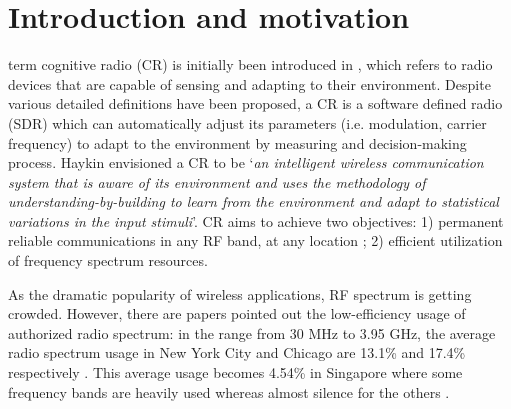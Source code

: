 \documentclass[journal]{IEEEtran}
\begin{document}
\section{Introduction and motivation}
%
%
%
%
 term cognitive radio (CR) is initially been introduced in \cite{mitola1999cognitive}, which refers to radio devices that are capable of sensing and adapting to their environment.  Despite various detailed definitions have been proposed, a CR is a software defined radio (SDR) which can automatically adjust its parameters (i.e. modulation, carrier frequency) to adapt to the environment by measuring and decision-making process. Haykin \cite{haykin2005cognitive} envisioned a CR to be `\textsl{an intelligent wireless communication system that is aware of its environment and uses the methodology of understanding-by-building to learn from the environment and adapt to statistical variations in the input stimuli}'. CR aims to achieve two objectives: 1) permanent reliable communications in any RF band, at any location \cite{bkassiny2013survey}; 2) efficient utilization of frequency spectrum resources.


As the dramatic popularity of wireless applications, RF spectrum is getting crowded. However, there are papers pointed out the low-efficiency usage of authorized radio spectrum: in the range from 30 MHz to 3.95 GHz, the average radio spectrum usage in New York City and Chicago are 13.1\% and 17.4\% respectively \cite{mchenry2006chicago}. This average usage becomes 4.54\% in Singapore where some frequency bands are heavily used whereas almost silence for the others \cite{islam2008spectrum}.
\end{document}
